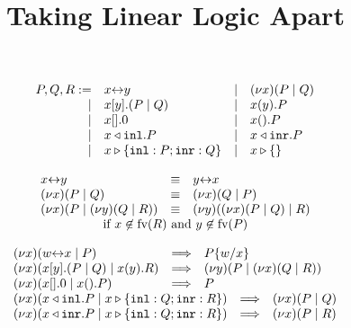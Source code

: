 \documentclass[aspectratio=169,xcolor={dvipsnames}]{beamer}
\title{Taking Linear Logic Apart}
\begin{document}
  \maketitle

  \begin{frame}[plain]
    \Large
    \[
      \begin{array}{rllll}
        \tm{P}, \tm{Q}, \tm{R}
           :=  & \tm{\cpLink{x}{y}}
        &  \mid& \tm{\cpCut{x}{P}{Q}}
        \\ \mid& \tm{\cpSend{x}{y}{P}{Q}}
        &  \mid& \tm{\cpRecv{x}{y}{P}}
        \\ \mid& \tm{\cpHalt{x}}
        &  \mid& \tm{\cpWait{x}{P}}
        \\ \mid& \tm{\cpInl{x}{P}}
        &  \mid& \tm{\cpInr{x}{P}}
        \\ \mid& \tm{\cpCase{x}{P}{Q}}
        &  \mid& \tm{\cpAbsurd{x}}
      \end{array}
    \]
  \end{frame}

  \begin{frame}[plain]
    \Large
    \[
      \begin{array}{lcll}
        \tm{\cpLink{x}{y}}
        & \equiv
        & \tm{\cpLink{y}{x}}
        \\
        \tm{\cpCut{x}{P}{Q}}
        & \equiv
        & \tm{\cpCut{x}{Q}{P}}
        \\
        \tm{\cpCut{x}{P}{\cpCut{y}{Q}{R}}}
        & \equiv
        & \tm{\cpCut{y}{\cpCut{x}{P}{Q}}{R}}
        \\
        \multicolumn{3}{c}{%
        \text{if } x \not\in \text{fv}(R) \text{ and } y \not\in \text{fv}(P)}
      \end{array}
    \]
  \end{frame}

  \begin{frame}[plain]
    \Large
    \[
      \begin{array}{l}
        \begin{array}{lcl}
          \tm{\cpCut{x}{\cpLink{w}{x}}{P}}
          & \Longrightarrow
          & \tm{\cpSub{w}{x}{P}}
          \\
          \tm{\cpCut{x}{\cpSend{x}{y}{P}{Q}}{\cpRecv{x}{y}{R}}}
          & \Longrightarrow
          & \tm{\cpCut{y}{P}{\cpCut{x}{Q}{R}}}
          \\
          \tm{\cpCut{x}{\cpHalt{x}}{\cpWait{x}{P}}}
          & \Longrightarrow
          & \tm{P}
        \end{array}
        \\
        \begin{array}{lcl}
          \tm{\cpCut{x}{\cpInl{x}{P}}{\cpCase{x}{Q}{R}}}
          & \Longrightarrow
          & \tm{\cpCut{x}{P}{Q}}
          \\
          \tm{\cpCut{x}{\cpInr{x}{P}}{\cpCase{x}{Q}{R}}}
          & \Longrightarrow
          & \tm{\cpCut{x}{P}{R}}
        \end{array}
      \end{array}
    \]
  \end{frame}
\end{document}
